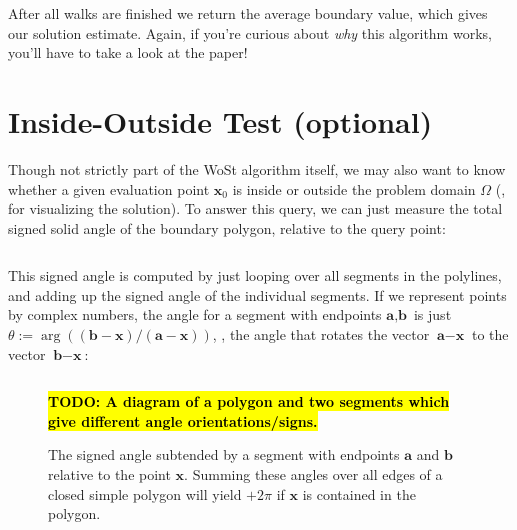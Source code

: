 \documentclass{article}
\newcommand{\todo}[1]{\textbf{\hl{TODO: #1}}}
\renewcommand{\vec}[1]{\textbf{#1}}
\begin{document}
\inputminted[fontsize=\small,linenos,firstline=150,lastline=157,bgcolor=bg]{cpp}{../code/WoStLaplace2D.cpp}

After all walks are finished we return the average boundary value, which gives our solution estimate.  Again, if you're curious about \emph{why} this algorithm works, you'll have to take a look at the paper!




\appendix

\section{Inside-Outside Test (optional)}
\label{sec:InsideOutsideTest}

Though not strictly part of the WoSt algorithm itself, we may also want to know whether a given evaluation point \(\vec{x}_0\) is inside or outside the problem domain \(\Omega\) (\eg, for visualizing the solution).  To answer this query, we can just measure the total signed solid angle of the boundary polygon, relative to the query point:

\inputminted[fontsize=\small,linenos,firstline=187,lastline=198,bgcolor=bg]{cpp}{../code/WoStLaplace2D.cpp}

This signed angle is computed by just looping over all segments in the polylines, and adding up the signed angle of the individual segments.  If we represent points by complex numbers, the angle for a segment with endpoints \(\vec{a},\vec{b}\) is just \(\theta := \arg((\vec{b}-\vec{x})/(\vec{a}-\vec{x}))\), \ie, the angle that rotates the vector \(\vec{a}-\vec{x}\) to the vector \(\vec{b}-\vec{x}\):

\inputminted[fontsize=\small,linenos,firstline=176,lastline=185,bgcolor=bg]{cpp}{../code/WoStLaplace2D.cpp}

\begin{figure}[h!]
   \todo{A diagram of a polygon and two segments which give different angle orientations/signs.}
   \caption{The signed angle subtended by a segment with endpoints \(\vec{a}\) and \(\vec{b}\) relative to the point \(\vec{x}\).  Summing these angles over all edges of a closed simple polygon will yield \(+2\pi\) if \(\vec{x}\) is contained in the polygon.}
\end{figure}
\end{document}
